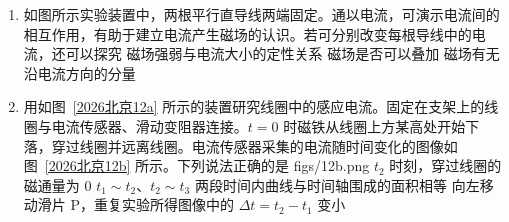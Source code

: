 \documentclass[\gkver]{gaokaozhenti}
\begin{document}
\begin{enumerate}
{根据牛顿第二定律 $F_{c}-mg=ma_{c}$，

可得 $ma_{c}>mg$，即 $a_{c}>g$，所以 $c$ 点加速度大于 $b$ 点加速度，故 B 错误；

C．从 $b$ 点到 $c$ 点，人先做加速度减小的加速运动（$mg>F$，加速度向下，人处于失重状态），过平衡位置后做加速度增大的减速运动（$F>mg$，加速度向上，人处于超重状态），故人先处于失重状态后处于超重状态，故 C 错误；

D．对于人、地球和弹性绳组成的系统，只有重力和弹力做功，机械能守恒，从 $a$ 点到 $c$ 点的过程中，人的动能先增大后减小，所以重力势能与弹性势能之和先减小后增大，故 D 正确。

故选 D。
}
\item
如图所示实验装置中，两根平行直导线两端固定。通以电流，可演示电流间的相互作用，有助于建立电流产生磁场的认识。若可分别改变每根导线中的电流，还可以探究 
{磁场强弱与电流大小的定性关系}
{磁场是否可以叠加}
{磁场有无沿电流方向的分量}

\item
用如图~\ref{2026北京12a} 所示的装置研究线圈中的感应电流。固定在支架上的线圈与电流传感器、滑动变阻器连接。$t=0$ 时磁铁从线圈上方某高处开始下落，穿过线圈并远离线圈。电流传感器采集的电流随时间变化的图像如图~\ref{2026北京12b} 所示。下列说法正确的是 
{figs/12b.png}
{$t_{2}$ 时刻，穿过线圈的磁通量为 $0$}
{$t_{1}\sim t_{2}$、$t_{2}\sim t_{3}$ 两段时间内曲线与时间轴围成的面积相等}
{向左移动滑片 P，重复实验所得图像中的 $\Delta t=t_{2}-t_{1}$ 变小}


\end{enumerate}
\end{document}
